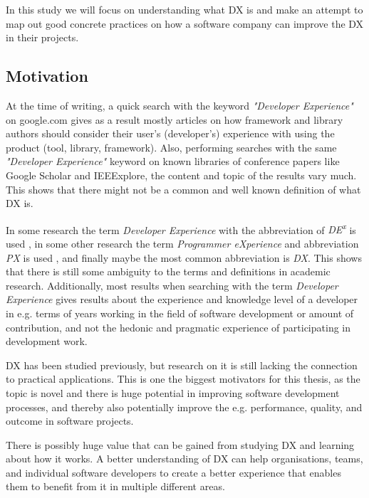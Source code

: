 \documentclass[english, 12pt, a4paper, sci, utf8, a-1b, online]{aaltothesis}
\begin{document}
In this study we will focus on understanding what DX is and make an attempt to map out good concrete practices on how a software company can improve the DX in their projects.

\thispagestyle{empty}

\subsection{Motivation}

At the time of writing, a quick search with the keyword \textit{"Developer Experience"} on google.com gives as a result mostly articles on how framework and library authors should consider their user's (developer's) experience with using the product (tool, library, framework). Also, performing searches with the same \textit{"Developer Experience"} keyword on known libraries of conference papers like Google Scholar and IEEExplore, the content and topic of the results vary much. This shows that there might not be a common and well known definition of what DX is.

In some research the term \textit{Developer Experience} with the abbreviation of \textit{DE\textsuperscript{x}} is used \cite{fagerholm-dx-concept-and-definition}, in some other research the term \textit{Programmer eXperience} and abbreviation \textit{PX} is used \cite{programmer-experience}, and finally maybe the most common abbreviation is \textit{DX}. This shows that there is still some ambiguity to the terms and definitions in academic research. Additionally, most results when searching with the term \textit{Developer Experience} gives results about the experience and knowledge level of a developer in e.g. terms of years working in the field of software development or amount of contribution, and not the hedonic and pragmatic experience of participating in development work.

DX has been studied previously, but research on it is still lacking the connection to practical applications. This is one the biggest motivators for this thesis, as the topic is novel and there is huge potential in improving software development processes, and thereby also potentially improve the e.g. performance, quality, and outcome in software projects.

There is possibly huge value that can be gained from studying DX and learning about how it works. A better understanding of DX can help organisations, teams, and individual software developers to create a better experience that enables them to benefit from it in multiple different areas.
\end{document}
